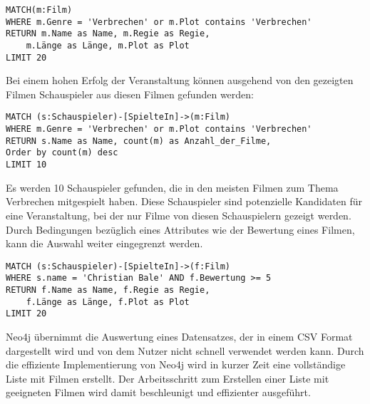 \begin{Verbatim}[frame=single]
MATCH(m:Film) 
WHERE m.Genre = 'Verbrechen' or m.Plot contains 'Verbrechen'
RETURN m.Name as Name, m.Regie as Regie, 
	m.Länge as Länge, m.Plot as Plot 
LIMIT 20
\end{Verbatim}
Bei einem hohen Erfolg der Veranstaltung können ausgehend von den gezeigten Filmen Schauspieler aus diesen Filmen gefunden werden:
\begin{Verbatim}[frame=single]
MATCH (s:Schauspieler)-[SpielteIn]->(m:Film)
WHERE m.Genre = 'Verbrechen' or m.Plot contains 'Verbrechen'
RETURN s.Name as Name, count(m) as Anzahl_der_Filme,
Order by count(m) desc
LIMIT 10
\end{Verbatim}
Es werden 10 Schauspieler gefunden, die in den meisten Filmen zum Thema Verbrechen mitgespielt haben. Diese Schauspieler sind potenzielle Kandidaten für eine Veranstaltung, bei der nur Filme von diesen Schauspielern gezeigt werden. Durch Bedingungen bezüglich eines Attributes wie der Bewertung eines Filmen, kann die Auswahl weiter eingegrenzt werden.
\begin{Verbatim}[frame=single]
MATCH (s:Schauspieler)-[SpielteIn]->(f:Film) 
WHERE s.name = 'Christian Bale' AND f.Bewertung >= 5
RETURN f.Name as Name, f.Regie as Regie, 
	f.Länge as Länge, f.Plot as Plot 
LIMIT 20
\end{Verbatim}
Neo4j übernimmt die Auswertung eines Datensatzes, der in einem CSV Format dargestellt wird und von dem Nutzer nicht schnell verwendet werden kann. Durch die effiziente Implementierung von Neo4j wird in kurzer Zeit eine vollständige Liste mit Filmen erstellt. Der Arbeitsschritt zum Erstellen einer Liste mit geeigneten Filmen wird damit beschleunigt und effizienter ausgeführt.
